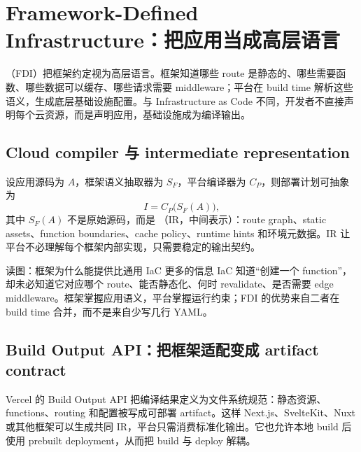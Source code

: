 \section{Framework-Defined Infrastructure：把应用当成高层语言}

（FDI）把框架约定视为高层语言。框架知道哪些 route 是静态的、哪些需要函数、哪些数据可以缓存、哪些请求需要 middleware；平台在 build time 解析这些语义，生成底层基础设施配置。与 Infrastructure as Code 不同，开发者不直接声明每个云资源，而是声明应用，基础设施成为编译输出。

\subsection{Cloud compiler 与 intermediate representation}

设应用源码为 $A$，框架语义抽取器为 $S_F$，平台编译器为 $C_P$，则部署计划可抽象为
\[
I=C_P\bigl(S_F(A)\bigr),
\]
其中 $S_F(A)$ 不是原始源码，而是 （IR，中间表示）：route graph、static assets、function boundaries、cache policy、runtime hints 和环境元数据。IR 让平台不必理解每个框架内部实现，只需要稳定的输出契约。


\begin{knowledgebox}{读图：框架为什么能提供比通用 IaC 更多的信息}
IaC 知道“创建一个 function”，却未必知道它对应哪个 route、能否静态化、何时 revalidate、是否需要 edge middleware。框架掌握应用语义，平台掌握运行约束；FDI 的优势来自二者在 build time 合并，而不是来自少写几行 YAML。
\end{knowledgebox}

\subsection{Build Output API：把框架适配变成 artifact contract}

Vercel 的 Build Output API 把编译结果定义为文件系统规范：静态资源、functions、routing 和配置被写成可部署 artifact。这样 Next.js、SvelteKit、Nuxt 或其他框架可以生成共同 IR，平台只需消费标准化输出。它也允许本地 build 后使用 prebuilt deployment，从而把 build 与 deploy 解耦。


